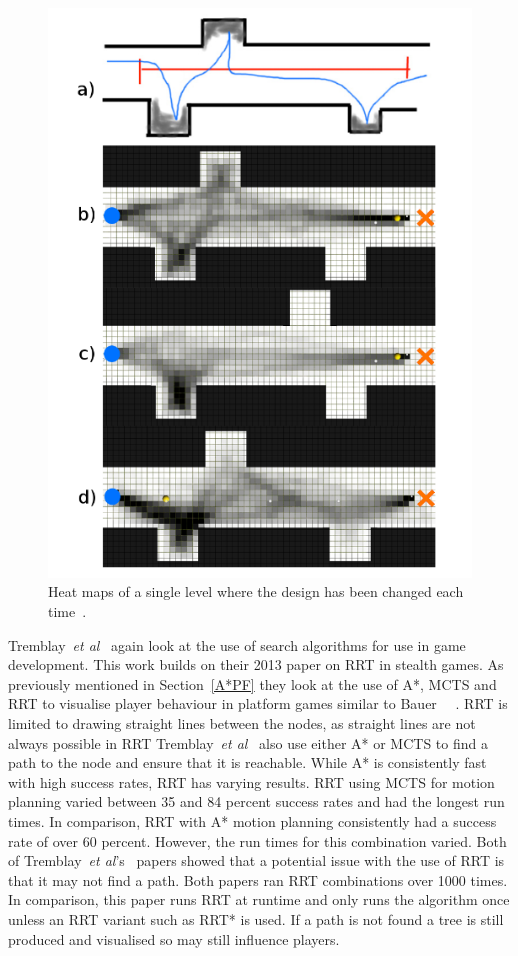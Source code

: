 \documentclass[journal]{IEEEtran}
\begin{document}
	\begin{figure}[h]
		\includegraphics[width=1.0\linewidth]{TremblayHeatMap.png}
		\caption{Heat maps of a single level where the design has been changed each time~\cite{Tremblay2013}.}
		\label{TremblayHeatMap}
	\end{figure} 
	
	Tremblay~\textit{et al}~\cite{Tremblay2014} again look at the use of search algorithms for use in game development. This work builds on their 2013 paper on RRT in stealth games. As previously mentioned in Section~\ref{A*PF} they look at the use of A*, MCTS and RRT to visualise player behaviour in platform games similar to Bauer ~\cite{Tremblay2014}~\cite{bauer2012}.  RRT is limited to drawing straight lines between the nodes, as straight lines are not always possible in RRT Tremblay~\textit{et al}~\cite{Tremblay2014} also use either A* or MCTS to find a path to the node and ensure that it is reachable.
	While A* is consistently fast with high success rates, RRT has varying results. RRT using MCTS for motion planning varied between 35 and 84 percent success rates and had the longest run times. In comparison, RRT with A* motion planning consistently had a success rate of over 60 percent. However, the run times for this combination varied. 
	Both of Tremblay~\textit{et al}'s~\cite{Tremblay2014, Tremblay2013} papers showed that a potential issue with the use of RRT is that it may not find a path. Both papers ran RRT combinations over 1000 times. In comparison, this paper runs RRT at runtime and only runs the algorithm once unless an RRT variant such as RRT* is used. If a path is not found a tree is still produced and visualised so may still influence players.
	
\end{document}
